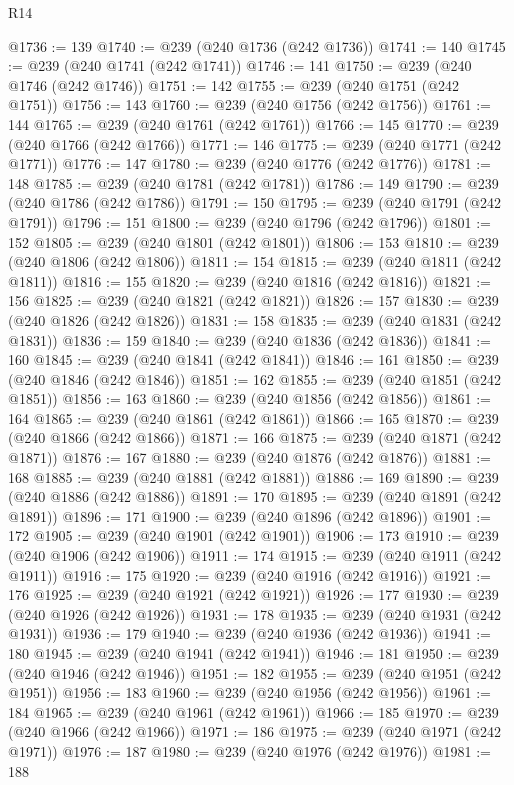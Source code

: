 \begin{lexlean}{R14}
\begin{coremodule}
{{{{{{{{{{{{{{{{{{{{{{{{{{{{{{{{{{{{{{{{{{{{{{{{{{{{{{{{{{{{{{{{{{{{{{{{{{{{{{{{{{{{{{{{{{{{{{{{{{{{{{{{{{@1736 := 139
@1740 := @239 (@240 @1736 (@242 @1736))
@1741 := 140
@1745 := @239 (@240 @1741 (@242 @1741))
@1746 := 141
@1750 := @239 (@240 @1746 (@242 @1746))
@1751 := 142
@1755 := @239 (@240 @1751 (@242 @1751))
@1756 := 143
@1760 := @239 (@240 @1756 (@242 @1756))
@1761 := 144
@1765 := @239 (@240 @1761 (@242 @1761))
@1766 := 145
@1770 := @239 (@240 @1766 (@242 @1766))
@1771 := 146
@1775 := @239 (@240 @1771 (@242 @1771))
@1776 := 147
@1780 := @239 (@240 @1776 (@242 @1776))
@1781 := 148
@1785 := @239 (@240 @1781 (@242 @1781))
@1786 := 149
@1790 := @239 (@240 @1786 (@242 @1786))
@1791 := 150
@1795 := @239 (@240 @1791 (@242 @1791))
@1796 := 151
@1800 := @239 (@240 @1796 (@242 @1796))
@1801 := 152
@1805 := @239 (@240 @1801 (@242 @1801))
@1806 := 153
@1810 := @239 (@240 @1806 (@242 @1806))
@1811 := 154
@1815 := @239 (@240 @1811 (@242 @1811))
@1816 := 155
@1820 := @239 (@240 @1816 (@242 @1816))
@1821 := 156
@1825 := @239 (@240 @1821 (@242 @1821))
@1826 := 157
@1830 := @239 (@240 @1826 (@242 @1826))
@1831 := 158
@1835 := @239 (@240 @1831 (@242 @1831))
@1836 := 159
@1840 := @239 (@240 @1836 (@242 @1836))
@1841 := 160
@1845 := @239 (@240 @1841 (@242 @1841))
@1846 := 161
@1850 := @239 (@240 @1846 (@242 @1846))
@1851 := 162
@1855 := @239 (@240 @1851 (@242 @1851))
@1856 := 163
@1860 := @239 (@240 @1856 (@242 @1856))
@1861 := 164
@1865 := @239 (@240 @1861 (@242 @1861))
@1866 := 165
@1870 := @239 (@240 @1866 (@242 @1866))
@1871 := 166
@1875 := @239 (@240 @1871 (@242 @1871))
@1876 := 167
@1880 := @239 (@240 @1876 (@242 @1876))
@1881 := 168
@1885 := @239 (@240 @1881 (@242 @1881))
@1886 := 169
@1890 := @239 (@240 @1886 (@242 @1886))
@1891 := 170
@1895 := @239 (@240 @1891 (@242 @1891))
@1896 := 171
@1900 := @239 (@240 @1896 (@242 @1896))
@1901 := 172
@1905 := @239 (@240 @1901 (@242 @1901))
@1906 := 173
@1910 := @239 (@240 @1906 (@242 @1906))
@1911 := 174
@1915 := @239 (@240 @1911 (@242 @1911))
@1916 := 175
@1920 := @239 (@240 @1916 (@242 @1916))
@1921 := 176
@1925 := @239 (@240 @1921 (@242 @1921))
@1926 := 177
@1930 := @239 (@240 @1926 (@242 @1926))
@1931 := 178
@1935 := @239 (@240 @1931 (@242 @1931))
@1936 := 179
@1940 := @239 (@240 @1936 (@242 @1936))
@1941 := 180
@1945 := @239 (@240 @1941 (@242 @1941))
@1946 := 181
@1950 := @239 (@240 @1946 (@242 @1946))
@1951 := 182
@1955 := @239 (@240 @1951 (@242 @1951))
@1956 := 183
@1960 := @239 (@240 @1956 (@242 @1956))
@1961 := 184
@1965 := @239 (@240 @1961 (@242 @1961))
@1966 := 185
@1970 := @239 (@240 @1966 (@242 @1966))
@1971 := 186
@1975 := @239 (@240 @1971 (@242 @1971))
@1976 := 187
@1980 := @239 (@240 @1976 (@242 @1976))
@1981 := 188
}}}}}}}}}}}}}}}}}}}}}}}}}}}}}}}}}}}}}}}}}}}}}}}}}}}}}}}}}}}}}}}}}}}}}}}}}}}}}}}}}}}}}}}}}}}}}}}}}}}}}}}}}}
\end{coremodule}
\end{lexlean}
